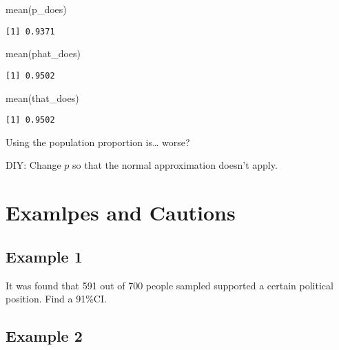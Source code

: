 \documentclass[
  letterpaper,
  DIV=11,
  numbers=noendperiod]{scrreprt}
\newenvironment{Shaded}{\begin{snugshade}}{\end{snugshade}}
\newcommand{\FunctionTok}[1]{\textcolor[rgb]{0.28,0.35,0.67}{#1}}
\newcommand{\NormalTok}[1]{\textcolor[rgb]{0.00,0.23,0.31}{#1}}
\def\pause{}
\begin{document}
\begin{Shaded}
\begin{Highlighting}[]
\FunctionTok{mean}\NormalTok{(p\_does)}
\end{Highlighting}
\end{Shaded}

\begin{verbatim}
[1] 0.9371
\end{verbatim}

\begin{Shaded}
\begin{Highlighting}[]
\FunctionTok{mean}\NormalTok{(phat\_does)}
\end{Highlighting}
\end{Shaded}

\begin{verbatim}
[1] 0.9502
\end{verbatim}

\begin{Shaded}
\begin{Highlighting}[]
\FunctionTok{mean}\NormalTok{(that\_does)}
\end{Highlighting}
\end{Shaded}

\begin{verbatim}
[1] 0.9502
\end{verbatim}

Using the population proportion is\ldots{} worse?\pause

DIY: Change \(p\) so that the normal approximation doesn't apply.

\hypertarget{examlpes-and-cautions}{%
\section{Examlpes and Cautions}\label{examlpes-and-cautions}}

\hypertarget{example-1-1}{%
\subsection{Example 1}\label{example-1-1}}

It was found that 591 out of 700 people sampled supported a certain
political position. Find a 91\%CI.

\hypertarget{example-2-1}{%
\subsection{Example 2}\label{example-2-1}}
\end{document}
